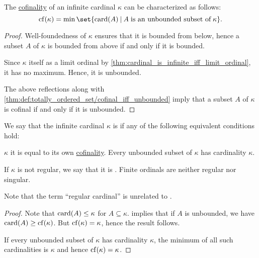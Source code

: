 \begin{proposition}\label{thm:cardinal_cofinality}
  The \hyperref[def:cofinality]{cofinality} of an infinite cardinal \( \kappa \) can be characterized as follows:
  \begin{equation*}
    \op{cf}(\kappa) = \min\set{ \card(A) \given A \T{is an unbounded subset of} \kappa }.
  \end{equation*}
\end{proposition}
\begin{proof}
  Well-foundedness of \( \kappa \) ensures that it is bounded from below, hence a subset \( A \) of \( \kappa \) is bounded from above if and only if it is bounded.

  Since \( \kappa \) itself as a limit ordinal by \cref{thm:cardinal_is_infinite_iff_limit_ordinal}, it has no maximum. Hence, it is unbounded.

  The above reflections along with \cref{thm:def:totally_ordered_set/cofinal_iff_unbounded} imply that a subset \( A \) of \( \kappa \) is cofinal if and only if it is unbounded.
\end{proof}

\begin{definition}\label{def:regular_cardinal}
  We say that the infinite cardinal \( \kappa \) is  if any of the following equivalent conditions hold:
  \begin{thmenum}
     \( \kappa \) it is equal to its own \hyperref[def:cofinality]{cofinality}.
     Every unbounded subset of \( \kappa \) has cardinality \( \kappa \).
  \end{thmenum}

  If \( \kappa \) is not regular, we say that it is . Finite ordinals are neither regular nor singular.
\end{definition}
\begin{comments}
  \item Note that the term \enquote{regular cardinal} is unrelated to .
\end{comments}
\begin{proof}
   Note that \( \operatorname{card}(A) \leq \kappa \) for \( A \subseteq \kappa \).  implies that if \( A \) is unbounded, we have \( \card(A) \geq \op{cf}(\kappa) \). But \( \op{cf}(\kappa) = \kappa \), hence the result follows.

   If every unbounded subset of \( \kappa \) has cardinality \( \kappa \), the minimum of all such cardinalities is \( \kappa \) and hence \( \op{cf}(\kappa) = \kappa \).
\end{proof}

